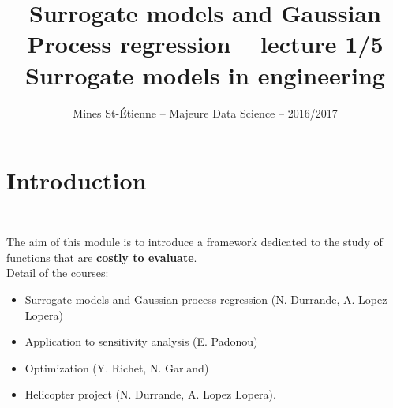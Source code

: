 \documentclass{beamer}
\title[Majeure Data Science -- Surrogate models and GPR]{\texorpdfstring{ \small Surrogate models and Gaussian Process regression -- lecture 1/5 \\ \vspace{3mm} \LARGE Surrogate models in engineering}{}}
\author[Mines St-\'Etienne ]{Mines St-\'Etienne -- Majeure Data Science -- 2016/2017}
\institute{\texorpdfstring{Nicolas Durrande (durrande@emse.fr)}{}}
\date{\null}
\begin{document}
\begin{frame}
  \titlepage
\end{frame}

\section[Intro.]{Introduction}
\subsection{}

\begin{frame}{}
\\
\vspace{0.5cm}
The aim of this module is to introduce a framework dedicated to the study of functions that are \textbf{costly to evaluate}.\\
\vspace{5mm}
Detail of the courses:
\begin{itemize}
	\item Surrogate models and Gaussian process regression (N. Durrande, A. Lopez Lopera)
	\item Application to sensitivity analysis (E. Padonou)
	\item Optimization (Y. Richet, N. Garland)
	\item Helicopter project (N. Durrande, A. Lopez Lopera).
\end{itemize}
\end{frame}
\end{document}
